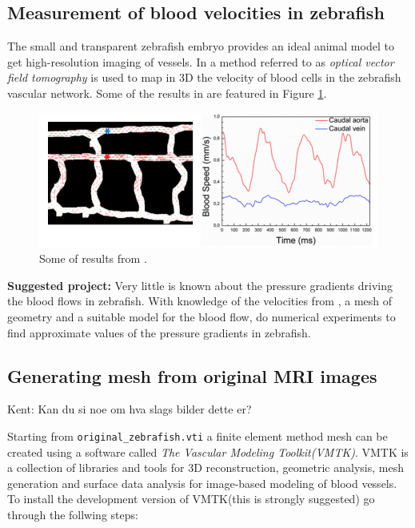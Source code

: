 \documentclass[epsfig,11pt]{article}
\begin{document}
\subsection{Measurement of blood velocities in zebrafish}

The small and transparent zebrafish embryo provides an ideal animal model to get high-resolution imaging of vessels. In \cite{fieramonti2015quantitative} a method referred to as \emph{optical vector field tomography} is used to map in 3D the velocity of blood cells in the zebrafish vascular network. Some of the results in \cite{fieramonti2015quantitative} are featured in Figure \ref{fig:blood_velocity}.

\begin{figure}[h!] 
\begin{center}
  \includegraphics[scale=0.5]{blood_velocities.png}
  \end{center}
  \caption{Some of results from \cite{fieramonti2015quantitative}.}
        \label{fig:blood_velocity}
\end{figure}

\textbf{Suggested project:} Very little is known about the pressure gradients driving the blood flows in zebrafish. With knowledge of the velocities from \cite{fieramonti2015quantitative}, a mesh of geometry and a suitable model for the blood flow, do numerical experiments to find approximate values of the pressure gradients in zebrafish.

\subsection{Generating mesh from original MRI images}

{\color{red} Kent: Kan du si noe om hva slags bilder dette er?}

Starting from \texttt{original\_zebrafish.vti} a finite element method mesh can be created using a software called \emph{The Vascular Modeling Toolkit(VMTK)}. VMTK is a collection of libraries and tools for 3D reconstruction, geometric analysis, mesh generation and surface data analysis for image-based modeling of blood vessels. To install the development version of VMTK(this is strongly suggested) go through the follwing steps: 
\end{document}
